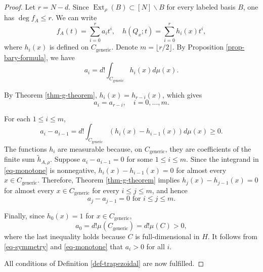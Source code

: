 \documentclass[10pt,a4paper]{amsart}
\newcommand{\op}{\operatorname}
\begin{document}
\begin{proof}
  Let $r=N-d$.
  Since $\op{Ext}_\rho(B)\subset[N]\backslash B$ for every labeled basis $B$, one has $\deg f_A\leq r$.
  We can write
  \begin{equation*}
    f_A(t)=\sum_{i=0}^{r}a_i t^i,\quad h(Q_x;t)=\sum_{i=0}^r h_i(x)t^i,
  \end{equation*}
  where $h_i(x)$ is defined on $C_{\mathrm{generic}}$. Denote $m=\lfloor r/2\rfloor$.
  By Proposition \ref{prop-bary-formula}, we have
  \begin{equation*}
    a_i=d!\int_{C_{\mathrm{generic}}} h_i(x)d\mu(x).
  \end{equation*}
  
  By Theorem \ref{thm-g-theorem}, $h_i(x)=h_{r-i}(x)$, which gives
  \begin{equation}
    \label{eq-symmetry}
    a_i=a_{r-i},\quad i=0,\dots,m.
  \end{equation}
  
  For each $1\leq i\leq m$, 
  \begin{equation}
    \label{eq-monotone}
    a_i-a_{i-1}=d! \int_{C_{\mathrm{generic}}} (h_i(x)-h_{i-1}(x))d\mu(x)\geq0.
  \end{equation}
  The functions $h_i$ are measurable because, on $C_{\mathrm{generic}}$, they are coefficients of the finite sum $\tilde h_{A,\rho}$. Suppose $a_i-a_{i-1}=0$ for some $1\leq i\leq m$. Since the integrand in \eqref{eq-monotone} is nonnegative, $h_i(x)-h_{i-1}(x)=0$ for almost every $x\in C_{\mathrm{generic}}$.
  Therefore, Theorem \ref{thm-g-theorem} implies $h_j(x)-h_{j-1}(x)=0$ for almost every $x\in C_{\mathrm{generic}}$ for every $i\leq j\leq m$, and hence
  \begin{equation}
    \label{eq-plateau}
    a_j-a_{j-1}=0\text{  for  }i\leq j\leq m.
  \end{equation} 
  
  Finally, since $h_0(x)=1$ for $x\in C_{\mathrm{generic}}$,
  \begin{equation}
    \label{eq-positive}
    a_0=d! \mu(C_{\mathrm{generic}})=d! \mu(C)>0,
  \end{equation}
  where the last inequality holds because $C$ is full-dimensional in $H$. It follows from \eqref{eq-symmetry} and \eqref{eq-monotone} that $a_i>0$ for all $i$.
  
  All conditions of Definition \ref{def-trapezoidal} are now fulfilled. 
\end{proof}
\end{document}
